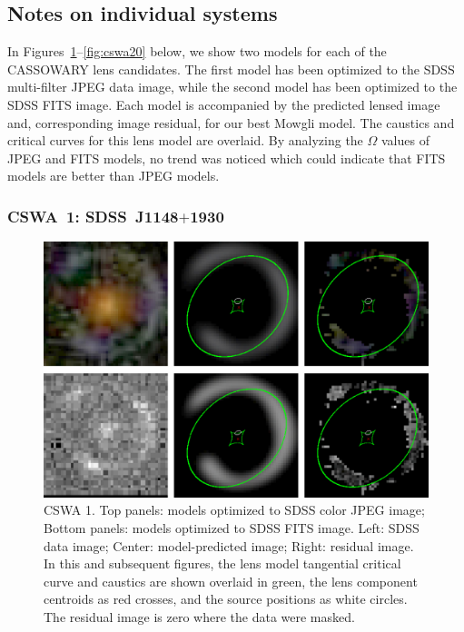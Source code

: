 \documentclass[iop]{emulateapj}
\def\theapplet{{\sc Mowgli}\xspace}
\begin{document}

\subsection{Notes on individual systems}
\label{sec:results:indi}

In Figures~\ref{fig:cswa1}--\ref{fig:cswa20} below, we show two models for each
of the CASSOWARY lens candidates. The first model has been optimized to the
SDSS multi-filter JPEG data image, while the second model has been optimized
to the SDSS FITS image. Each model is accompanied by the predicted lensed image
and, corresponding image residual, for our best \theapplet model.  The caustics
and critical curves for this lens model are overlaid. By analyzing the $\Omega$
values of JPEG and FITS models, no trend was noticed which could indicate that
FITS models are better than JPEG models.


\subsubsection*{CSWA~1: SDSS\ J1148$+$1930}
\label{sec:results:indinotes:cswa1}


\begin{figure}[!ht]
	\centering\includegraphics[width=\linewidth]{figs/1.eps}
	\caption{CSWA 1. Top panels: models optimized to SDSS color JPEG image;
	Bottom panels: models optimized to SDSS FITS image.  Left: SDSS data image;
	Center: model-predicted image; Right: residual image. In this and subsequent
	figures, the lens model tangential 
	critical curve and caustics are shown overlaid in green, the lens component
	centroids as red crosses, and the source positions as white circles. 
	The residual image
	is zero where the data were masked.}
	\label{fig:cswa1}
\end{figure}
\end{document}
